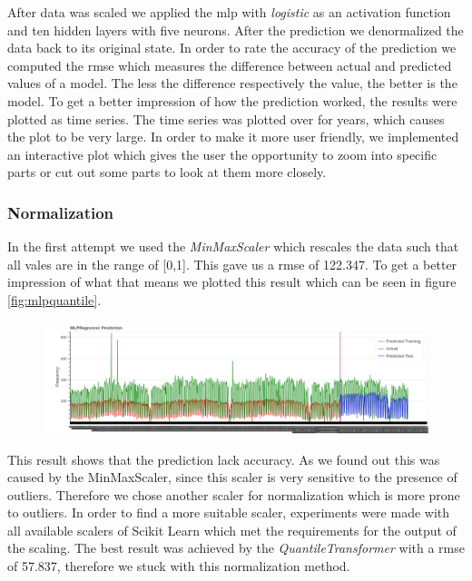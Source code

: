 After data was scaled we applied the \acs{mlp} with \emph{logistic} as an activation function and ten hidden layers with five neurons. After the prediction we denormalized the data back to its original state. In order to rate the accuracy of the prediction we computed the \acf{rmse} which measures the difference between actual and predicted values of a model. The less the difference respectively the value, the better is the model.
To get a better impression of how the prediction worked, the results were plotted as time series.
The time series was plotted over for years, which causes the plot to be very large. In order to make it more user friendly, we implemented an interactive plot which gives the user the opportunity to zoom into specific parts or cut out some parts to look at them more closely.
\subsubsection{Normalization}\label{sec:normalization}
In the first attempt we used the \emph{MinMaxScaler} which rescales the data such that all vales are in the range of [0,1].
This gave us a \acs{rmse} of 122.347. To get a better impression of what that means we plotted this result which can be seen in figure \ref{fig:mlpquantile}.
\begin{figure}[H]
\hspace{-2.8cm}
\includegraphics[width=1.4\textwidth]{img/mlpminmax}\label{fig:mlpminmax}
\label{fig:mlpminmax}
\end{figure}
This result shows that the prediction lack accuracy. As we found out this was caused by the MinMaxScaler, since this scaler is very sensitive to the presence of outliers. Therefore we chose another scaler for normalization which is more prone to outliers. In order to find a more suitable scaler, experiments were made with all available scalers of Scikit Learn which met the requirements for the output of the scaling. The best result was achieved by the \emph{QuantileTransformer} with a \acs{rmse} of 57.837, therefore we stuck with this normalization method.
